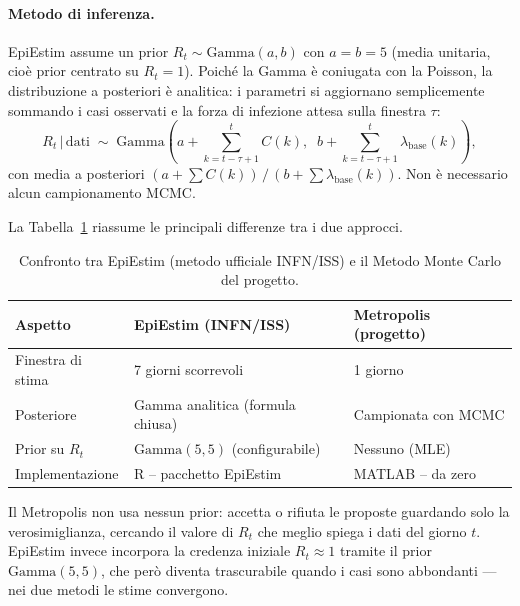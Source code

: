 \documentclass[12pt, a4paper]{article}
\begin{document}
\paragraph{Metodo di inferenza.}
EpiEstim assume un prior $R_t \sim \mathrm{Gamma}(a, b)$ con $a = b = 5$
(media unitaria, cioè prior centrato su $R_t = 1$).
Poiché la Gamma è coniugata con la Poisson, la distribuzione a posteriori è analitica:
i parametri si aggiornano semplicemente sommando i casi osservati e la forza di infezione
attesa sulla finestra $\tau$:
\begin{equation}
    R_t \,\big|\, \text{dati} \;\sim\; \mathrm{Gamma}\!\left(
        a + \sum_{k=t-\tau+1}^{t} C(k),\;\;
        b + \sum_{k=t-\tau+1}^{t} \lambda_{\text{base}}(k)
    \right),
    \label{eq:epiestim_posterior}
\end{equation}
con media a posteriori $(a + \sum C(k))\,/\,(b + \sum \lambda_{\text{base}}(k))$.
Non è necessario alcun campionamento MCMC.

La Tabella~\ref{tab:confronto_metodi} riassume le principali differenze tra i due approcci.

\begin{table}[htbp]
\centering
\caption{Confronto tra EpiEstim (metodo ufficiale INFN/ISS) e il Metodo Monte Carlo del progetto.}
\label{tab:confronto_metodi}
\begin{tabular}{lll}
\toprule
\textbf{Aspetto}          & \textbf{EpiEstim (INFN/ISS)}            & \textbf{Metropolis (progetto)} \\
\midrule
Finestra di stima         & 7 giorni scorrevoli                     & 1 giorno \\
Posteriore                & Gamma analitica (formula chiusa)        & Campionata con MCMC \\
Prior su $R_t$            & $\mathrm{Gamma}(5,5)$ (configurabile)   & Nessuno (MLE) \\
Implementazione           & R -- pacchetto EpiEstim                 & MATLAB -- da zero \\
\bottomrule
\end{tabular}
\end{table}

Il Metropolis non usa nessun prior: accetta o rifiuta le proposte guardando solo la
verosimiglianza, cercando il valore di $R_t$ che meglio spiega i dati del giorno $t$.
EpiEstim invece incorpora la credenza iniziale $R_t \approx 1$ tramite il prior $\mathrm{Gamma}(5,5)$,
che però diventa trascurabile quando i casi sono abbondanti — nei due metodi le stime convergono.
\end{document}
